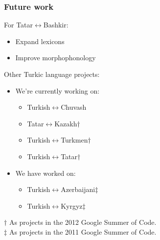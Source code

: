 \documentclass[10pt,xetex]{beamer} %
\begin{document}
\begin{frame}
  \frametitle{Future work}

\begin{block}{For Tatar$\leftrightarrow$Bashkir:}
  \begin{itemize}
    \item Expand lexicons 
    \item Improve morphophonology
  \end{itemize}
\end{block}

\begin{block}{Other Turkic language projects:}
  \begin{itemize}
    \item We're currently working on:

    \begin{itemize}
      \item Turkish$\leftrightarrow$Chuvash
      \item Tatar$\leftrightarrow$Kazakh$\dag$
      \item Turkish$\leftrightarrow$Turkmen$\dag$
      \item Turkish$\leftrightarrow$Tatar$\dag$
    \end{itemize}

    \item We have worked on: 
    \begin{itemize}
      \item Turkish$\leftrightarrow$Azerbaijani$\ddag$
      \item Turkish$\leftrightarrow$Kyrgyz$\ddag$
    \end{itemize}
  \end{itemize}
  $\dag$ As projects in the 2012 Google Summer of Code. \\
  $\ddag$ As projects in the 2011 Google Summer of Code.
\end{block}

\end{frame}
\end{document}
